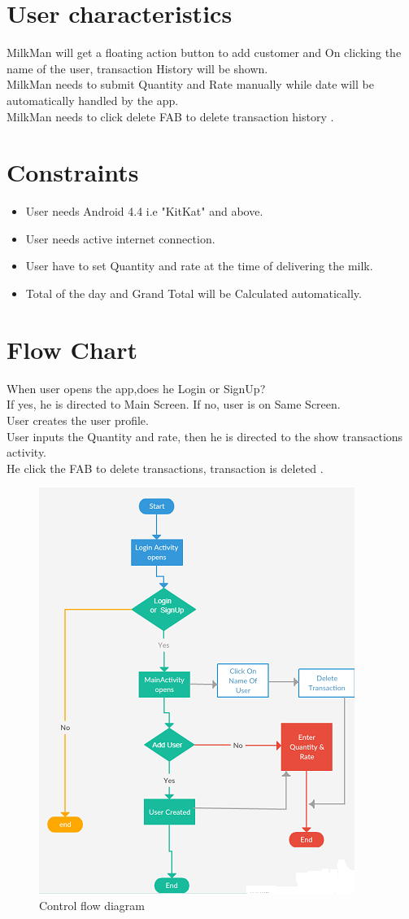 \section{User characteristics}
MilkMan will get a floating action button to add customer and On clicking the name of the user, transaction History will be shown.\\
MilkMan needs to submit Quantity and Rate manually while date will be automatically handled by the app.\\
MilkMan needs to click delete FAB to delete transaction history .
\section{Constraints} 
\begin{itemize}
	\item User needs Android 4.4 i.e "KitKat" and above.
	\item User needs active internet connection.
	\item User have to set Quantity and rate at the time of delivering the milk.
	\item Total of the day and Grand Total will be Calculated automatically.
\end{itemize}
\section{Flow Chart}
When user opens the app,does he Login or SignUp?\\
If yes, he is directed to Main Screen. If no, user is on Same Screen.\\
User creates the user profile.\\
User inputs the Quantity and rate, then he is directed  to the show transactions activity.\\
He click the FAB to delete transactions, transaction is deleted .
\begin{figure}[h]
	\centering
	\includegraphics[width=0.75\linewidth]{flowchart}
	\caption{Control flow diagram}
	\label{fig:flowchart}
\end{figure}
